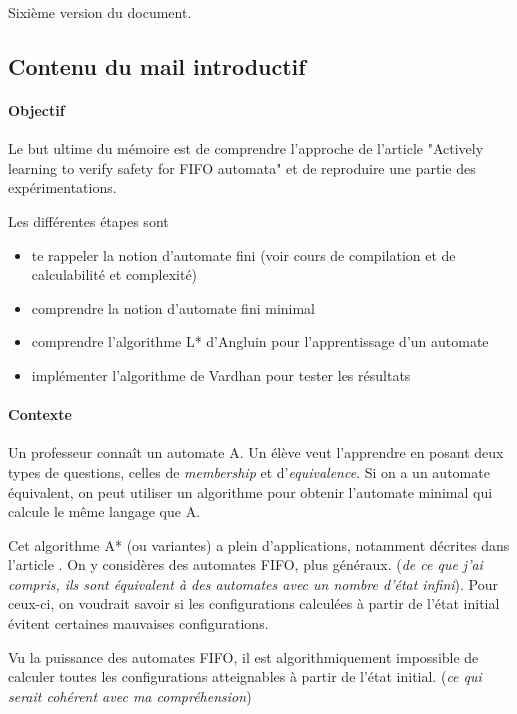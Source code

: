 Sixième version du document.

\subsection*{Contenu du mail introductif}

\paragraph{Objectif}

Le but ultime du mémoire est de comprendre l’approche de l’article "Actively learning to verify safety for FIFO automata" \cite{Vardhan04} et de reproduire une partie des expérimentations.

Les différentes étapes sont
\begin{itemize}
	\item te rappeler la notion d’automate fini (voir cours de compilation et de calculabilité et complexité)
	\item comprendre la notion d’automate fini minimal
	\item comprendre l’algorithme L* d’Angluin pour l’apprentissage d’un automate
	\item implémenter l'algorithme de Vardhan pour tester les résultats
\end{itemize}


\paragraph{Contexte}

Un professeur connaît un automate A. Un élève veut l'apprendre en posant deux types de questions, celles de \emph{membership} et d'\emph{equivalence}. Si on a un automate équivalent, on peut utiliser un algorithme pour obtenir l'automate minimal qui calcule le même langage que A.

Cet algorithme A* (ou variantes) a plein d'applications, notamment décrites dans l'article \cite{Vardhan04}. On y considères des automates FIFO, plus généraux. (\emph{de ce que j'ai compris, ils sont équivalent à des automates avec un nombre d'état infini}). Pour ceux-ci, on voudrait savoir si les configurations calculées à partir de l’état initial évitent certaines mauvaises configurations.

Vu la puissance des automates FIFO, il est algorithmiquement impossible de calculer toutes les configurations atteignables à partir de l’état initial. (\emph{ce qui serait cohérent avec ma compréhension})

